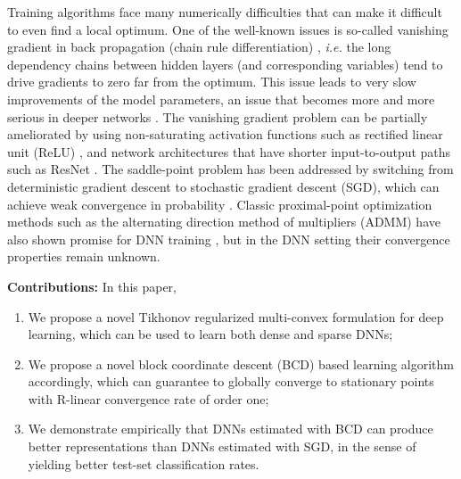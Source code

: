 \documentclass{article}
\def\ie{\emph{i.e. }}
\begin{document}
Training algorithms face many numerically difficulties that can make it difficult to even find a local optimum. One of the well-known issues is so-called vanishing gradient in back propagation (chain rule differentiation) \cite{chapter-gradient-flow-2001}, \ie the long dependency chains between hidden layers (and corresponding variables) tend to drive gradients to zero far from the optimum.  This issue leads to very slow improvements of the model parameters, an issue that becomes more and more serious in deeper networks \cite{glorot2010understanding}. The vanishing gradient problem can be partially ameliorated by using non-saturating activation functions such as rectified linear unit (ReLU) \cite{lecun2015deep}, and network architectures that have shorter input-to-output paths such as ResNet \cite{he2016deep}. %
The saddle-point problem has been addressed by switching from deterministic gradient descent to stochastic gradient descent (SGD), which can achieve weak convergence in probability \cite{bottou2016optimization}. %
 Classic proximal-point optimization methods such as the alternating direction method of multipliers (ADMM) have also shown promise for DNN training \cite{taylor2016training,Zhang_2016_CVPR}, but in the DNN setting their convergence properties remain unknown.  
	
	
	
	
	
	
	
{\bf Contributions:} In this paper, 
\begin{enumerate}[label*=\arabic*.]
\item We propose a novel Tikhonov regularized multi-convex formulation for deep learning, which can be used to learn both dense and sparse DNNs;
\item We propose a novel block coordinate descent (BCD) based learning algorithm accordingly, which can guarantee to globally converge to stationary points with R-linear convergence rate of order one;
\item We demonstrate empirically that DNNs estimated with BCD can produce better representations than DNNs estimated with SGD, in the sense of yielding better test-set classification rates. %
	\end{enumerate}
	
\end{document}
